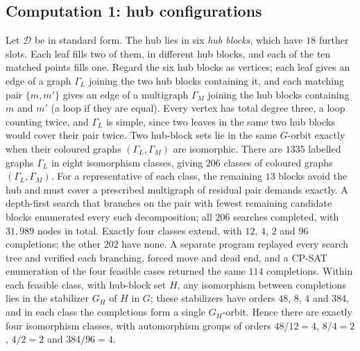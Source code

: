 \documentclass[11pt]{amsart}
\theoremstyle{definition}
\theoremstyle{remark}
\newcommand{\cD}{\mathcal{D}}
\begin{document}
\subsection*{Computation 1: hub configurations}
Let $\cD$ be in standard form. The hub lies in six \emph{hub blocks}, which
have $18$ further slots. Each leaf fills two of them, in different hub blocks,
and each of the ten matched points fills one. Regard the six hub blocks as
vertices; each leaf gives an edge of a graph $\Gamma_L$ joining the two hub
blocks containing it, and each matching pair $\{m,m'\}$ gives an edge of a
multigraph $\Gamma_M$ joining the hub blocks containing $m$ and $m'$ (a loop if
they are equal). Every vertex has total degree three, a loop counting twice,
and $\Gamma_L$ is simple, since two leaves in the same two hub blocks would
cover their pair twice. Two hub-block sets lie in the same $G$-orbit exactly
when their coloured graphs $(\Gamma_L,\Gamma_M)$ are isomorphic. There are
$1335$ labelled graphs $\Gamma_L$ in eight isomorphism classes, giving $206$
classes of coloured graphs $(\Gamma_L,\Gamma_M)$. For a representative of each class,
the remaining $13$ blocks avoid the hub and must cover a prescribed multigraph
of residual pair demands exactly. A depth-first search that branches on the
pair with fewest remaining candidate blocks enumerated every such
decomposition; all $206$ searches completed, with $31{,}989$ nodes in total.
Exactly four classes extend, with $12$, $4$, $2$ and $96$ completions; the
other $202$ have none. A separate program replayed every search tree and
verified each branching, forced move and dead end, and a CP-SAT enumeration of
the four feasible cases returned the same $114$ completions. Within each
feasible class, with hub-block set $H$, any isomorphism between completions
lies in the stabilizer $G_H$ of $H$ in $G$; these stabilizers have orders $48$, $8$, $4$ and
$384$, and in each class the completions form a single $G_H$-orbit. Hence
there are exactly four isomorphism classes, with automorphism groups of orders
$48/12=4$, $8/4=2$, $4/2=2$ and $384/96=4$.
\end{document}
